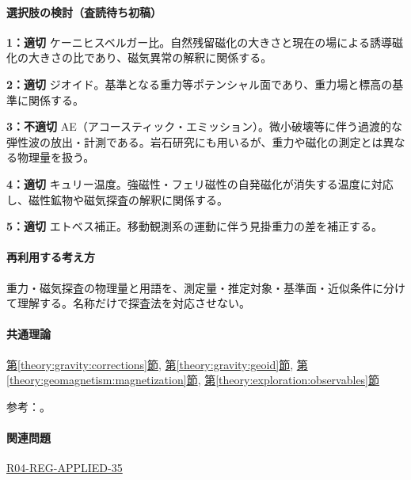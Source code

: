 \paragraph{選択肢の検討（査読待ち初稿）}\mbox{}\par

\noindent\textbf{1：適切} ケーニヒスベルガー比。自然残留磁化の大きさと現在の場による誘導磁化の大きさの比であり、磁気異常の解釈に関係する。\par

\noindent\textbf{2：適切} ジオイド。基準となる重力等ポテンシャル面であり、重力場と標高の基準に関係する。\par

\noindent\textbf{3：不適切} AE（アコースティック・エミッション）。微小破壊等に伴う過渡的な弾性波の放出・計測である。岩石研究にも用いるが、重力や磁化の測定とは異なる物理量を扱う。\par

\noindent\textbf{4：適切} キュリー温度。強磁性・フェリ磁性の自発磁化が消失する温度に対応し、磁性鉱物や磁気探査の解釈に関係する。\par

\noindent\textbf{5：適切} エトベス補正。移動観測系の運動に伴う見掛重力の差を補正する。\par

\paragraph{再利用する考え方} 重力・磁気探査の物理量と用語を、測定量・推定対象・基準面・近似条件に分けて理解する。名称だけで探査法を対応させない。

\paragraph{共通理論} \hyperref[theory:gravity:corrections]{第\ref*{theory:gravity:corrections}節}, \hyperref[theory:gravity:geoid]{第\ref*{theory:gravity:geoid}節}, \hyperref[theory:geomagnetism:magnetization]{第\ref*{theory:geomagnetism:magnetization}節}, \hyperref[theory:exploration:observables]{第\ref*{theory:exploration:observables}節}

\par 参考：\cite{gsi_gravity_definitions,kanaya_okuma2011,sato_lei2009_ae}。

\paragraph{関連問題} \hyperref[q:r04-reg-applied-35]{R04-REG-APPLIED-35}

